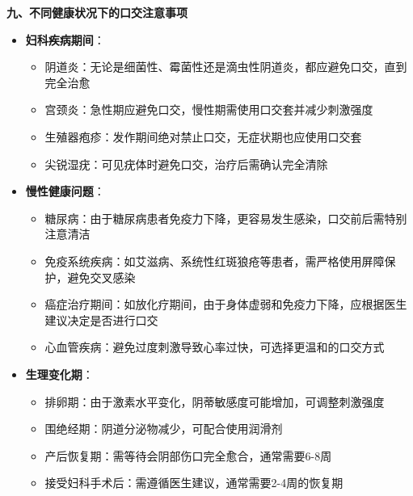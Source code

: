 \documentclass[12pt,UTF8]{ctexbook}
\begin{document}
  \textbf{九、不同健康状况下的口交注意事项}
  \begin{itemize}
  \item \textbf{妇科疾病期间}：
    \begin{itemize}
    \item 阴道炎：无论是细菌性、霉菌性还是滴虫性阴道炎，都应避免口交，直到完全治愈
    \item 宫颈炎：急性期应避免口交，慢性期需使用口交套并减少刺激强度
    \item 生殖器疱疹：发作期间绝对禁止口交，无症状期也应使用口交套
    \item 尖锐湿疣：可见疣体时避免口交，治疗后需确认完全清除
    \end{itemize}
  \item \textbf{慢性健康问题}：
    \begin{itemize}
    \item 糖尿病：由于糖尿病患者免疫力下降，更容易发生感染，口交前后需特别注意清洁
    \item 免疫系统疾病：如艾滋病、系统性红斑狼疮等患者，需严格使用屏障保护，避免交叉感染
    \item 癌症治疗期间：如放化疗期间，由于身体虚弱和免疫力下降，应根据医生建议决定是否进行口交
    \item 心血管疾病：避免过度刺激导致心率过快，可选择更温和的口交方式
    \end{itemize}
  \item \textbf{生理变化期}：
    \begin{itemize}
    \item 排卵期：由于激素水平变化，阴蒂敏感度可能增加，可调整刺激强度
    \item 围绝经期：阴道分泌物减少，可配合使用润滑剂
    \item 产后恢复期：需等待会阴部伤口完全愈合，通常需要6-8周
    \item 接受妇科手术后：需遵循医生建议，通常需要2-4周的恢复期
    \end{itemize}
  \end{itemize}
\end{document}
